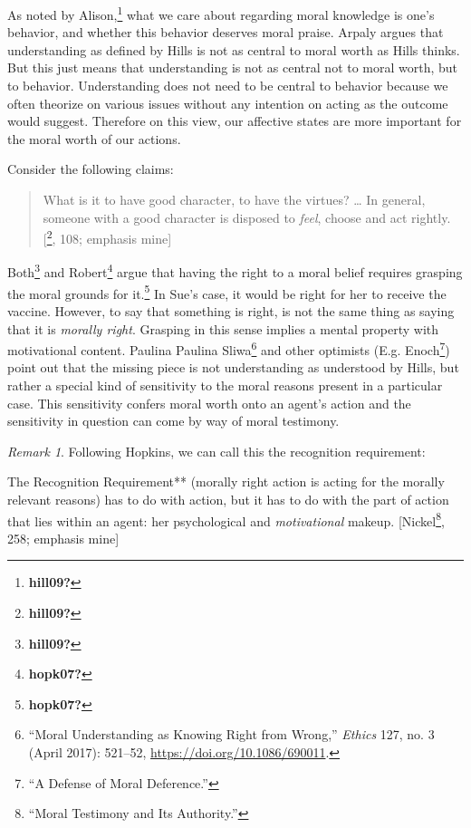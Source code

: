 \documentclass[phdthesis,12pt,final]{wuthesis}
\theoremstyle{definition}
\theoremstyle{definition}
\theoremstyle{definition}
\theoremstyle{definition}
\theoremstyle{remark}
\newtheorem*{remark}{Remark}
\begin{document}
As noted by Alison,\footnote{\textbf{hill09?}} what we care about regarding moral knowledge is one's behavior, and whether this behavior deserves moral praise. Arpaly argues that understanding as defined by Hills is not as central to moral worth as Hills thinks. But this just means that understanding is not as central not to moral worth, but to behavior. Understanding does not need to be central to behavior because we often theorize on various issues without any intention on acting as the outcome would suggest. Therefore on this view, our affective states are more important for the moral worth of our actions.

\noindent Consider the following claims:

\begin{quote}
What is it to have good character, to have the virtues? \ldots{} In general, someone with a good character is disposed to \emph{feel}, choose and act rightly. {[}\footnote{\textbf{hill09?}}, 108; emphasis mine{]}
\end{quote}

Both\footnote{\textbf{hill09?}} and Robert\footnote{\textbf{hopk07?}} argue that having the right to a moral belief requires grasping the moral grounds for it.\footnote{\textbf{hopk07?}} In Sue's case, it would be right for her to receive the vaccine. However, to say that something is right, is not the same thing as saying that it is \emph{morally right}. Grasping in this sense implies a mental property with motivational content. Paulina Paulina Sliwa\footnote{{``Moral {Understanding} as {Knowing Right} from {Wrong},''} \emph{Ethics} 127, no. 3 (April 2017): 521--52, \url{https://doi.org/10.1086/690011}.} and other optimists (E.g. Enoch\footnote{{``A {Defense} of {Moral Deference}.''}}) point out that the missing piece is not understanding as understood by Hills, but rather a special kind of sensitivity to the moral reasons present in a particular case. This sensitivity confers moral worth onto an agent's action and the sensitivity in question can come by way of moral testimony.

\begin{remark}
Following Hopkins, we can call this the recognition requirement:

The Recognition Requirement** (morally right action is acting for the morally relevant reasons) has to do with action, but it has to do with the part of action that lies within an agent: her psychological and \emph{motivational} makeup. {[}Nickel\footnote{{``Moral {Testimony} and Its {Authority}.''}}, 258; emphasis mine{]}
\end{remark}
\end{document}
